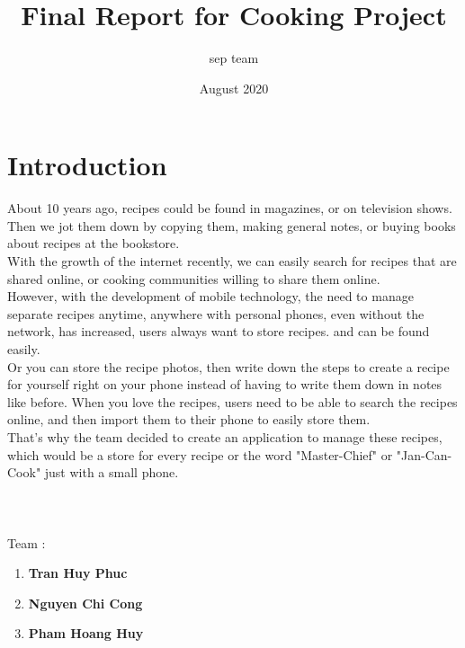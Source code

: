 \documentclass{article}
\title{Final Report for Cooking Project}
\author{sep team }
\date{August 2020}
\begin{document}
\maketitle

\section{Introduction}
About 10 years ago, recipes could be found in magazines, or on television shows.
Then we jot them down by copying them, making general notes, or buying books about recipes at the bookstore.\\
With the growth of the internet recently, we can easily search for recipes that are shared online, or cooking communities willing to share them online.\\
However, with the development of mobile technology, the need to manage separate recipes anytime, anywhere with personal phones, even without the network, has increased, users always want to store recipes. and can be found easily.\\
Or you can store the recipe photos, then write down the steps to create a recipe for yourself right on your phone instead of having to write them down in notes like before.
When you love the recipes, users need to be able to search the recipes online, and then import them to their phone to easily store them. \\
That's why the team decided to create an application to manage these recipes, which would be a store for every recipe or the word "Master-Chief" or "Jan-Can-Cook" just with a small phone. \\ \\ \\ \\
Team :
    \begin{enumerate}
        \item \textbf{Tran Huy Phuc} 
        \item \textbf{Nguyen Chi Cong }
        \item \textbf{Pham Hoang Huy}
    \end{enumerate}
\end{document}
